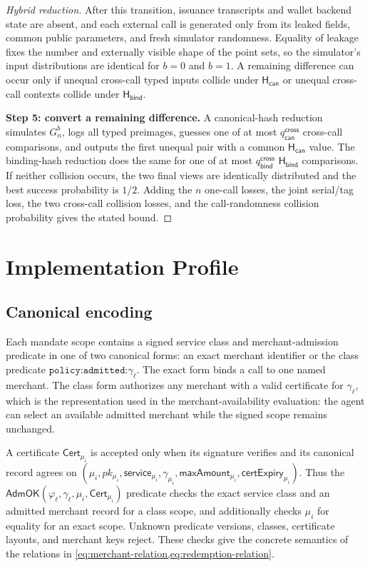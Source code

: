\documentclass[letterpaper]{article}
\newcommand{\hash}{\mathsf{H}_{\mathsf{can}}}
\newcommand{\hashBind}{\mathsf{H}_{\mathsf{bind}}}
\begin{document}
\begin{proof}[Hybrid reduction]
After this transition, issuance transcripts and wallet backend state are
absent, and each external call is generated only from its leaked fields, common
public parameters, and fresh simulator randomness. Equality of leakage fixes
the number and externally visible shape of the point sets, so the simulator's
input distributions are identical for \(b=0\) and \(b=1\). A remaining
difference can occur only if unequal cross-call typed inputs collide under
\(\hash\) or unequal cross-call contexts collide under \(\hashBind\).

\textbf{Step 5: convert a remaining difference.}
A canonical-hash reduction simulates \(G_n^b\), logs all typed preimages,
guesses one of at most \(q_{\mathsf{can}}^{\mathsf{cross}}\) cross-call
comparisons, and outputs
the first unequal pair with a common \(\hash\) value. The binding-hash reduction
does the same for one of at most
\(q_{\mathsf{bind}}^{\mathsf{cross}}\) \(\hashBind\) comparisons. If neither
collision occurs, the two final
views are identically distributed and the best success probability is
\(1/2\). Adding the \(n\) one-call losses, the joint serial/tag loss, the two
cross-call collision losses, and the call-randomness collision probability
gives the stated bound.
\end{proof}
\endgroup

\section{Implementation Profile}
\label{app:technical-addendum}


\subsection{Canonical encoding}

Each mandate scope contains a signed service class and merchant-admission
predicate in one of two canonical forms: an exact merchant identifier or the class
predicate \(\texttt{policy:admitted:}\gamma_\ell\). The exact form binds a
call to one named merchant. The class form authorizes any merchant with a
valid certificate for \(\gamma_\ell\), which is the representation used in the
merchant-availability evaluation: the agent can select an available admitted
merchant while the signed scope remains unchanged.

A certificate
\(\mathsf{Cert}_{\mu_i}\) is accepted only when its signature verifies and its
canonical record agrees on
\((\mu_i,pk_{\mu_i},\mathsf{service}_{\mu_i},\gamma_{\mu_i},
\mathsf{maxAmount}_{\mu_i},\mathsf{certExpiry}_{\mu_i})\). Thus the
\(\mathsf{AdmOK}(\varphi_\ell,\gamma_\ell,\mu_i,\mathsf{Cert}_{\mu_i})\)
predicate checks the exact service class and an admitted merchant record for a
class scope, and additionally checks \(\mu_i\) for equality for an exact
scope. Unknown predicate versions, classes, certificate layouts, and merchant
keys reject. These checks give the concrete semantics of the relations in
\cref{eq:merchant-relation,eq:redemption-relation}.
\end{document}
